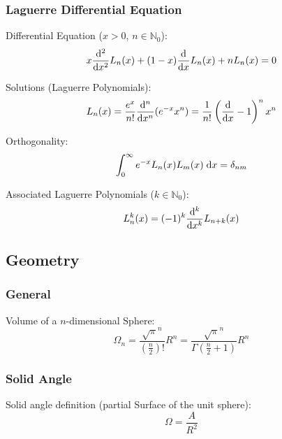 		\subsubsection{Laguerre Differential Equation}
			\noindent
			Differential Equation ($x>0$, $n\in\mathbb{N}_0$):
			\begin{equation}
				x\frac{\mathrm{d}^2}{\mathrm{d} x^2}L_n(x) +(1-x)\frac{\mathrm{d} }{\mathrm{d} x}L_n(x) + nL_n(x) = 0
			\end{equation}

			\noindent
			Solutions (Laguerre Polynomials):
			\begin{equation}
				L_n(x) = \frac{e^x}{n!}\frac{\mathrm{d}^n}{\mathrm{d} x^n}(e^{-x} x^n) = \frac{1}{n!} \left(\frac{\mathrm{d} }{\mathrm{d} x}-1\right)^n x^n
			\end{equation}

			\noindent
			Orthogonality:
			\begin{equation}
				\int_0^\infty e^{-x} L_n(x) L_m(x)\;\mathrm{d} x = \delta_{nm}
			\end{equation}

			\noindent
			Associated Laguerre Polynomials ($k\in\mathbb{N}_0$):
			\begin{equation}
				L_n^k(x) = (-1)^k\frac{\mathrm{d}^k}{\mathrm{d} x^k} L_{n+k}(x)
			\end{equation}

	\subsection{Geometry}
		\subsubsection{General}
			\noindent
			Volume of a $n$-dimensional Sphere:
			\begin{equation}
				\Omega_n = \frac{\sqrt{\pi}^n}{\left(\frac{n}{2}\right)!}R^n
				= \frac{\sqrt{\pi}^n}{\Gamma\left(\frac{n}{2}+1\right)}R^n
			\end{equation}


		\subsubsection{Solid Angle}
			\noindent
			Solid angle definition (partial Surface of the unit sphere):
			\begin{equation}
				\Omega = \frac{A}{R^2}
			\end{equation}

